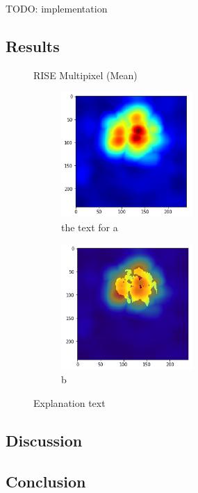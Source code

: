 TODO: implementation

\subsection{Results}
\begin{figure}[H]
    \centering
    \caption{RISE Multipixel (Mean)}
    \begin{subfigure}{.5\textwidth}
        \centering
        \includegraphics[width=5cm]{chapters/04_segmentation/images/rise_multipixel_max_1-0.png}
        \caption{ the text for a}
    \end{subfigure}%
    \begin{subfigure}{.5\textwidth}
        \centering
        \includegraphics[width=5cm]{chapters/04_segmentation/images/rise_multipixel_max_1-1.png}
        \caption{b}
    \end{subfigure}
    \caption{Explanation text}
\end{figure}

\subsection{Discussion}

\subsection{Conclusion}

